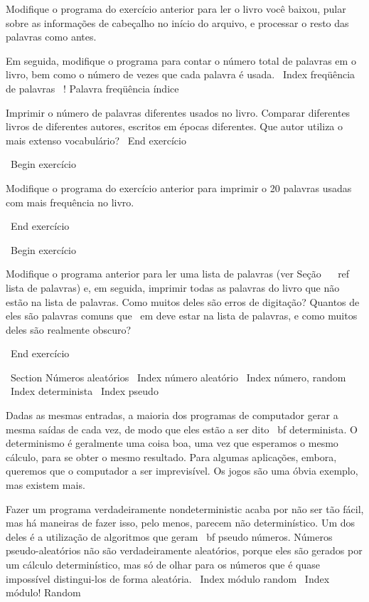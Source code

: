 \documentclass[10pt]{book}
\begin{document}
\begin {itemize}
{{{{{{{{{Modifique o programa do exercício anterior para ler o livro
você baixou, pular sobre as informações de cabeçalho no início
do arquivo, e processar o resto das palavras como antes.

Em seguida, modifique o programa para contar o número total de palavras em
o livro, bem como o número de vezes que cada palavra é usada.
\ Index {freqüência de palavras}
\ {! Palavra freqüência} índice

Imprimir o número de palavras diferentes usados ​​no livro. Comparar
diferentes livros de diferentes autores, escritos em épocas diferentes.
Que autor utiliza o mais extenso vocabulário?
\ End {} exercício


\ Begin {} exercício

Modifique o programa do exercício anterior para imprimir o
20 palavras usadas com mais frequência no livro.

\ End {} exercício


\ Begin {} exercício

Modifique o programa anterior para ler uma lista de palavras (ver
Seção ~ \ ref {lista de palavras}) e, em seguida, imprimir todas as palavras do livro que
não estão na lista de palavras. Como muitos deles são erros de digitação? Quantos de
eles são palavras comuns que {\ em} deve estar na lista de palavras, e como
muitos deles são realmente obscuro?

\ End {} exercício


\ Section {Números aleatórios}
\ Index {número aleatório}
\ Index {número, random}
\ Index {} determinista
\ Index {pseudo}

Dadas as mesmas entradas, a maioria dos programas de computador gerar a mesma
saídas de cada vez, de modo que eles estão a ser dito {\ bf determinista}.
O determinismo é geralmente uma coisa boa, uma vez que esperamos o mesmo
cálculo, para se obter o mesmo resultado. Para algumas aplicações, embora,
queremos que o computador a ser imprevisível. Os jogos são uma óbvia
exemplo, mas existem mais.

Fazer um programa verdadeiramente nondeterministic acaba por não ser tão fácil,
mas há maneiras de fazer isso, pelo menos, parecem não determinístico. Um dos
deles é a utilização de algoritmos que geram {\ bf pseudo} números.
Números pseudo-aleatórios não são verdadeiramente aleatórios, porque eles são gerados
por um cálculo determinístico, mas só de olhar para os números que
é quase impossível distingui-los de forma aleatória.
\ Index {módulo random}
\ Index {módulo! Random}

}}}}}}}}}
\end{itemize}
\end{document}
